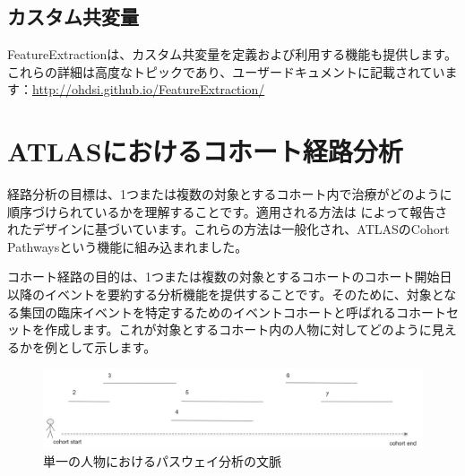 \documentclass[
  11pt]{book}
\newenvironment{Shaded}{\begin{snugshade}}{\end{snugshade}}
\newcommand{\NormalTok}[1]{#1}
\newcommand{\SpecialCharTok}[1]{\textcolor[rgb]{0.81,0.36,0.00}{\textbf{#1}}}
\theoremstyle{definition}
\theoremstyle{definition}
\theoremstyle{definition}
\theoremstyle{definition}
\theoremstyle{remark}
\begin{document}
\begin{Shaded}
\end{Shaded}

\subsection{カスタム共変量}\label{ux30abux30b9ux30bfux30e0ux5171ux5909ux91cf}

FeatureExtractionは、カスタム共変量を定義および利用する機能も提供します。これらの詳細は高度なトピックであり、ユーザードキュメントに記載されています：\url{http://ohdsi.github.io/FeatureExtraction/}

\section{ATLASにおけるコホート経路分析}\label{atlasux306bux304aux3051ux308bux30b3ux30dbux30fcux30c8ux7d4cux8defux5206ux6790}

経路分析の目標は、1つまたは複数の対象とするコホート内で治療がどのように順序づけられているかを理解することです。適用される方法は \citet{Hripcsak7329} によって報告されたデザインに基づいています。これらの方法は一般化され、ATLASのCohort Pathwaysという機能に組み込まれました。

コホート経路の目的は、1つまたは複数の対象とするコホートのコホート開始日以降のイベントを要約する分析機能を提供することです。そのために、対象となる集団の臨床イベントを特定するためのイベントコホートと呼ばれるコホートセットを作成します。これが対象とするコホート内の人物に対してどのように見えるかを例として示します。

\begin{figure}

{\centering \includegraphics[width=1\linewidth]{images/Characterization/pathwaysPersonEventView} 

}

\caption{単一の人物におけるパスウェイ分析の文脈}\label{fig:pathwaysPersonEventView}
\end{figure}
\end{document}
